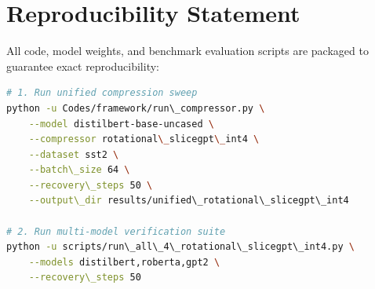 \section{Reproducibility Statement}
All code, model weights, and benchmark evaluation scripts are packaged to guarantee exact reproducibility:
\begin{lstlisting}[language=bash]
# 1. Run unified compression sweep
python -u Codes/framework/run\_compressor.py \
    --model distilbert-base-uncased \
    --compressor rotational\_slicegpt\_int4 \
    --dataset sst2 \
    --batch\_size 64 \
    --recovery\_steps 50 \
    --output\_dir results/unified\_rotational\_slicegpt\_int4

# 2. Run multi-model verification suite
python -u scripts/run\_all\_4\_rotational\_slicegpt\_int4.py \
    --models distilbert,roberta,gpt2 \
    --recovery\_steps 50
\end{lstlisting}
